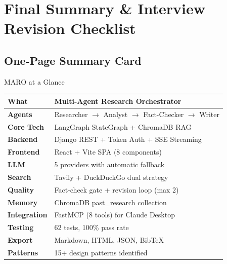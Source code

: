 \documentclass[11pt,a4paper,twoside]{report}
\begin{document}

\chapter{Final Summary \& Interview Revision Checklist}

\section{One-Page Summary Card}

\begin{conceptbox}{MARO at a Glance}
\begin{center}
\begin{tabular}{|l|l|}
\hline
\textbf{What} & Multi-Agent Research Orchestrator \\
\hline
\textbf{Agents} & Researcher $\rightarrow$ Analyst $\rightarrow$ Fact-Checker $\rightarrow$ Writer \\
\hline
\textbf{Core Tech} & LangGraph StateGraph + ChromaDB RAG \\
\hline
\textbf{Backend} & Django REST + Token Auth + SSE Streaming \\
\hline
\textbf{Frontend} & React + Vite SPA (8 components) \\
\hline
\textbf{LLM} & 5 providers with automatic fallback \\
\hline
\textbf{Search} & Tavily + DuckDuckGo dual strategy \\
\hline
\textbf{Quality} & Fact-check gate + revision loop (max 2) \\
\hline
\textbf{Memory} & ChromaDB past\_research collection \\
\hline
\textbf{Integration} & FastMCP (8 tools) for Claude Desktop \\
\hline
\textbf{Testing} & 62 tests, 100\% pass rate \\
\hline
\textbf{Export} & Markdown, HTML, JSON, BibTeX \\
\hline
\textbf{Patterns} & 15+ design patterns identified \\
\hline
\end{tabular}
\end{center}
\end{conceptbox}



\end{document}
